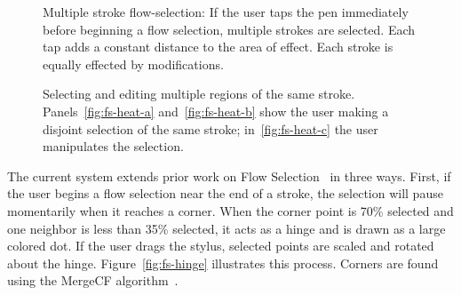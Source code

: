 \documentclass{egpubl}
\begin{document}
\begin{figure}
  \centering {}
\caption{Multiple stroke flow-selection: If the user taps the pen
  immediately before beginning a flow selection, multiple strokes are
  selected. Each tap adds a constant distance to the area of
  effect. Each stroke is equally effected by modifications.}
  \label{fig:fs-multi}
\end{figure}

\begin{figure}
  \centering {}
\caption{Selecting and editing multiple regions of the same
  stroke. Panels~\ref{fig:fs-heat-a} and~\ref{fig:fs-heat-b} show the
  user making a disjoint selection of the same stroke;
  in~\ref{fig:fs-heat-c} the user manipulates the selection.}
  \label{fig:fs-heat}
\end{figure}

The current system extends prior work on Flow
Selection~\cite{johnson-flow-selection} in three ways. First, if the
user begins a flow selection near the end of a stroke, the selection
will pause momentarily when it reaches a corner. When the corner point
is 70\% selected and one neighbor is less than 35\% selected, it acts
as a hinge and is drawn as a large colored dot. If the user drags the
stylus, selected points are scaled and rotated about the
hinge. Figure~\ref{fig:fs-hinge} illustrates this process. Corners are
found using the MergeCF algorithm~\cite{wolin-smr}.
\end{document}

